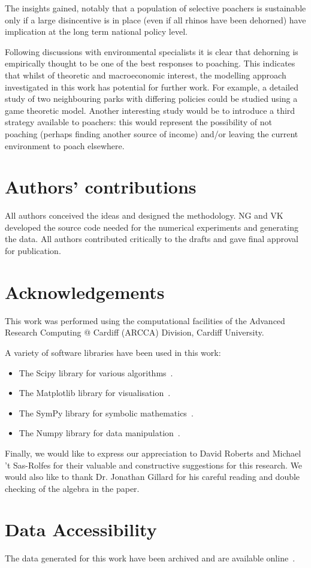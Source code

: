 \documentclass[10pt]{article}
\begin{document}
The insights gained, notably that a population of selective poachers is
sustainable only if a large disincentive is in place (even if all rhinos have
been dehorned) have implication at the long term national policy level.

Following discussions with environmental specialists it is clear that dehorning
is empirically thought to be one of the best responses to poaching. This
indicates that whilst of theoretic and macroeconomic interest, the modelling
approach investigated in this work has potential for further work. For example,
a detailed study of two neighbouring parks with differing policies could be
studied using a game theoretic model. Another interesting study would be to
introduce a third strategy available to poachers: this would represent the
possibility of not poaching (perhaps finding another source of income) and/or
leaving the current environment to poach elsewhere.

\section*{Authors' contributions}

All authors conceived the ideas and designed the methodology. NG and VK developed the
source code needed for the numerical experiments and generating the data. All authors
contributed critically to the drafts and gave final approval for publication.

\section*{Acknowledgements}

This work was performed using the computational facilities of the Advanced
Research Computing @ Cardiff (ARCCA) Division, Cardiff University.

A variety of software libraries have been used in this work:

\begin{itemize}
    \item The Scipy library for various algorithms~\cite{scipy}.
    \item The Matplotlib library for visualisation~\cite{hunter2007matplotlib}.
    \item The SymPy library for symbolic mathematics~\cite{sympy}.
    \item The Numpy library for data manipulation~\cite{walt2011numpy}.
\end{itemize}

Finally, we would like to express our appreciation to David Roberts and Michael 't
Sas-Rolfes for their valuable and constructive suggestions for this research.
We would also like to thank
Dr. Jonathan Gillard for his careful reading and double checking of the algebra in the paper.

\section*{Data Accessibility}

The data generated for this work have been archived and are available
online~\cite{Glynatsi2017}.



\end{document}
